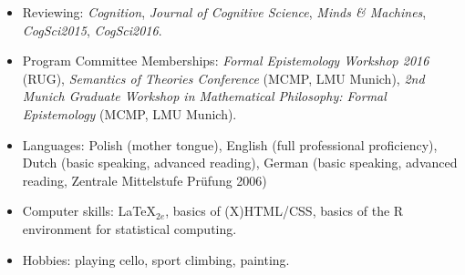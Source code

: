 \documentclass[a4paper,12pt]{article}
\begin{document}
\begin{small}
\begin{itemize}
    \item Reviewing: \emph{Cognition}, \emph{Journal of Cognitive Science}, \emph{Minds \& Machines}, \emph{CogSci2015}, \emph{CogSci2016}.
    
    \item Program Committee Memberships: \emph{Formal Epistemology Workshop 2016} (RUG), \emph{Semantics of Theories Conference} (MCMP, LMU Munich), \emph{2nd Munich Graduate Workshop in Mathematical Philosophy: Formal Epistemology} (MCMP, LMU Munich).
  \end{itemize}



  \begin{itemize}
  \item Languages: Polish (mother tongue), English (full professional proficiency), Dutch
    (basic speaking, advanced reading), German (basic speaking, advanced reading, Zentrale
    Mittelstufe Pr\"ufung 2006)
  \item Computer skills: \LaTeX$_{2e}$, basics of
    (X)HTML/CSS, basics of the R environment for statistical
    computing.

  \item Hobbies: playing cello, sport climbing, painting.
  \end{itemize}






\end{small}
\end{document}
